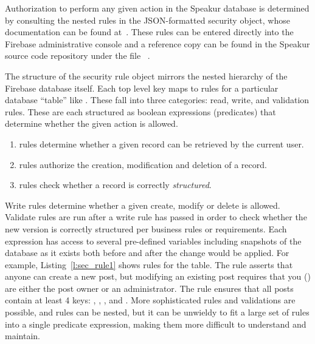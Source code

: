 Authorization to perform any given action in the Speakur database is determined by consulting the nested rules in the 
JSON-formatted security object, 
whose documentation can be found at~\cite{firebasecontributors2015-a}.
These rules can be entered directly into the Firebase administrative console
and a reference copy can be found in the Speakur source code repository under the file ~\cite{landers2015-c}.

The structure of the security rule object mirrors the nested hierarchy of the Firebase database itself.
Each top level key maps to rules for a particular database ``table'' like .
These fall into three categories: read, write, and validation rules.
These are each structured as boolean expressions (predicates) that determine whether the given action is allowed.

\begin{enumerate}
\item {} rules determine whether a given record can be retrieved by the current user.
\item {} rules authorize the creation, modification and deletion of a record.
\item {} rules check whether a record is correctly \textit{structured}.
\end{enumerate}

Write rules determine whether a given create, modify or delete is allowed. 
Validate rules are run after a write rule has passed in order to check whether the new version is correctly structured per business rules or requirements.
Each expression has access to several pre-defined variables including snapshots of the database as it exists both before and after the change would be applied.
For example, Listing~\ref{l:sec_rule1} shows rules for the  table.
The  rule asserts that anyone can create a new post, 
but modifying an existing post requires that you () are either the post owner or an administrator.
The  rule ensures that all posts contain at least 4 keys: , , , and .
More sophisticated rules and validations are possible, and rules can be nested, 
but it can be unwieldy to fit a large set of rules into a single predicate expression, 
making them more difficult to understand and maintain.

